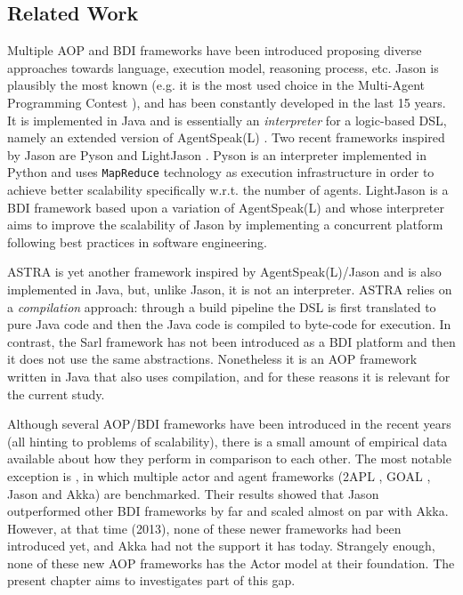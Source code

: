 \subsection{Related Work}
Multiple AOP and BDI frameworks have been introduced proposing diverse approaches towards language, execution model, reasoning process, etc. Jason \cite{Bordini2005} is plausibly the most known (e.g. it is the most used choice in the Multi-Agent Programming Contest \cite{mapc}), and has been constantly developed in the last 15 years. It is implemented in Java and is essentially an \textit{interpreter} for a logic-based DSL, namely an extended version of AgentSpeak(L) \cite{RaoAS1996}.  Two recent frameworks inspired by Jason are Pyson \cite{pyson} and LightJason \cite{LJ}. Pyson is an interpreter implemented in Python and uses \verb+MapReduce+ technology as execution infrastructure in order to achieve better scalability specifically w.r.t. the number of agents. LightJason is a BDI framework based upon a variation of AgentSpeak(L) and whose interpreter aims to improve the scalability of Jason by implementing a concurrent platform following best practices in software engineering.

ASTRA \cite{Astra} is yet another framework inspired by AgentSpeak(L)/Jason and is also implemented in Java, but, unlike Jason, it is not an interpreter. ASTRA relies on a \textit{compilation} approach: through a build pipeline the DSL is first translated to pure Java code and then the Java code is compiled to byte-code for execution. In contrast, the Sarl \cite{Sarl} framework has not been introduced as a BDI platform and then it does not use the same abstractions. Nonetheless it is an AOP framework written in Java that also uses compilation, and for these reasons it is relevant for the current study.


Although several AOP/BDI frameworks have been introduced in the recent years (all hinting to problems of scalability), there is a small amount of empirical data available about how they perform in comparison to each other. The most notable exception is  \cite{Cardoso2013}, in which multiple actor and agent frameworks (2APL \cite{Dastani2APL}, GOAL \cite{Hindriks2009a}, Jason and Akka) are benchmarked. Their results showed that Jason outperformed other BDI frameworks by far and scaled almost on par with Akka. However, at that time (2013), none of these newer frameworks had been introduced yet, and Akka had not the support it has today. Strangely enough, none of these new AOP frameworks has the Actor model at their foundation. The present chapter aims to investigates part of this gap.


